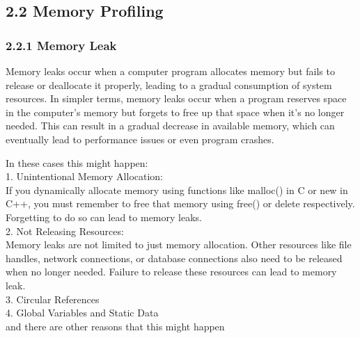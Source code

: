 \documentclass{article}
\begin{document}
\subsection*{\Large 2.2 Memory Profiling}
\subsubsection*{\large 2.2.1 Memory Leak}
Memory leaks occur when a computer program allocates memory but fails to release or deallocate it properly, leading to a gradual consumption of system resources. In simpler terms, memory leaks occur when a program reserves space in the computer's memory but forgets to free up that space when it's no longer needed. This can result in a gradual decrease in available memory, which can eventually lead to performance issues or even program crashes.

In these cases this might happen:\\
1. Unintentional Memory Allocation:\\
If you dynamically allocate memory using functions like malloc() in C or new in C++, you must remember to free that memory using free() or delete respectively. Forgetting to do so can lead to memory leaks.\\
2. Not Releasing Resources:\\
Memory leaks are not limited to just memory allocation. Other resources like file handles, network connections, or database connections also need to be released when no longer needed. Failure to release these resources can lead to memory leak.\\
3. Circular References\\
4. Global Variables and Static Data\\
and there are other reasons that this might happen\\
\end{document}

